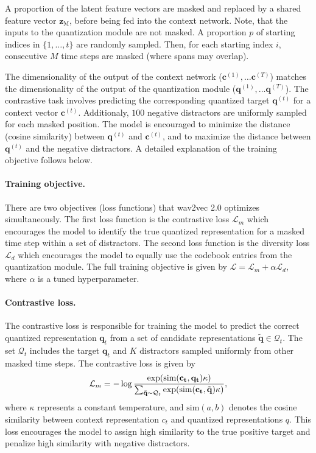 A proportion of the latent feature vectors are masked and replaced by a shared feature vector $\mathbf{z}_{\text{M}}$, before being fed into the context network.
Note, that the inputs to the quantization module are not masked.
A proportion $p$ of starting indices in $\{1, \dots, t\}$ are randomly sampled. 
Then, for each starting index $i$, consecutive $M$ time steps are masked (where spans may overlap).

The dimensionality of the output of the context network ($\mathbf{c}^{(1)}, \dots \mathbf{c}^{(T)}$) matches the dimensionality of the 
output of the quantization module ($\mathbf{q}^{(1)}, \dots \mathbf{q}^{(T)}$).
The contrastive task involves predicting the corresponding quantized target $\mathbf{q}^{(t)}$ for a context vector $\mathbf{c}^{(t)}$.
Additionaly, $100$ negative distractors are uniformly sampled for each masked position.
The model is encouraged to minimize the distance (cosine similarity) between $\mathbf{q}^{(t)}$ and $\mathbf{c}^{(t)}$, and to maximize the distance between $\mathbf{q}^{(t)}$ and the negative distractors.
A detailed explanation of the training objective follows below.

\paragraph*{Training objective.} \label{par:obj}
There are two objectives (loss functions) that wav2vec 2.0 optimizes simultaneously.
The first loss function is the contrastive loss $\mathcal{L}_m$ which encourages the model to
identify the true quantized representation for a masked time step within a set of distractors. 
The second loss function is the diversity loss $\mathcal{L}_d$ which encourages the model 
to equally use the codebook entries from the quantization module.
The full training objective is given by $\mathcal{L} = \mathcal{L}_m + \alpha \mathcal{L}_d$, where $\alpha$ is a tuned hyperparameter.

\paragraph*{Contrastive loss.}
The contrastive loss is responsible for training the model to predict the correct quantized 
representation $\mathbf{q}_t$ from a set of candidate representations $\mathbf{\tilde{q}} \in \mathcal{Q}_t$. 
The set $\mathcal{Q}_t$ includes the target $\mathbf{q}_t$ and $K$ distractors sampled uniformly from other masked time steps. 
The contrastive loss is given by
\begin{equation}
    \mathcal{L}_m = -\log \dfrac{\exp(\text{sim}(\mathbf{c_t}, \mathbf{q_t}) \/ \kappa)}{\sum_{\mathbf{\tilde{q}} \sim \mathcal{Q}_t} \exp(\text{sim}(\mathbf{c_t}, \mathbf{\tilde{q}}) \/ \kappa)},
\end{equation}
where $\kappa$ represents a constant temperature, and $\text{sim}(a, b)$ denotes the cosine similarity between 
context representation $c_t$ and quantized representations $q$. 
This loss encourages the model to assign high similarity to the true 
positive target and penalize high similarity with negative distractors.

